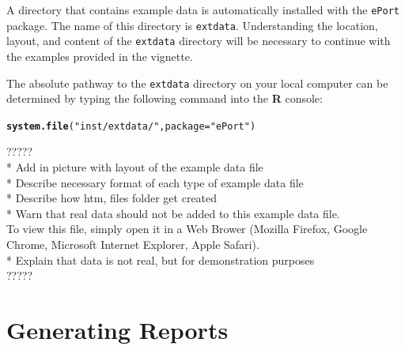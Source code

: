 \documentclass{article}\usepackage[]{graphicx}\usepackage[]{color}
\makeatletter
\newcommand{\hlstr}[1]{\textcolor[rgb]{0.192,0.494,0.8}{#1}}%
\newcommand{\hlstd}[1]{\textcolor[rgb]{0.345,0.345,0.345}{#1}}%
\newcommand{\hlkwc}[1]{\textcolor[rgb]{0.333,0.667,0.333}{#1}}%
\newcommand{\hlkwd}[1]{\textcolor[rgb]{0.737,0.353,0.396}{\textbf{#1}}}%
\newenvironment{kframe}{%
 \def\at@end@of@kframe{}%
 \ifinner\ifhmode%
  \def\at@end@of@kframe{\end{minipage}}%
  \begin{minipage}{\columnwidth}%
 \fi\fi%
 \def\FrameCommand##1{\hskip\@totalleftmargin \hskip-\fboxsep
 \colorbox{shadecolor}{##1}\hskip-\fboxsep
     \hskip-\linewidth \hskip-\@totalleftmargin \hskip\columnwidth}%
 \MakeFramed {\advance\hsize-\width
   \@totalleftmargin\z@ \linewidth\hsize
   \@setminipage}}%
 {\par\unskip\endMakeFramed%
 \at@end@of@kframe}
\newenvironment{knitrout}{}{} %
\numberwithin{equation}{section} %
\makeatother
\begin{document}
A directory that contains example data is automatically installed with the \texttt{ePort} package. The name of this directory is \texttt{extdata}. Understanding the location, layout, and content of the \texttt{extdata} directory will be necessary to continue with the examples provided in the vignette.

The absolute pathway to the \texttt{extdata} directory on your local computer can be determined by typing the following command into the \textbf{\textsf{R}} console: \\

\begin{knitrout}
\color{fgcolor}\begin{kframe}
\begin{alltt}
\hlkwd{system.file}\hlstd{(}\hlstr{"inst/extdata/"}\hlstd{,} \hlkwc{package} \hlstd{=} \hlstr{"ePort"}\hlstd{)}
\end{alltt}
\end{kframe}
\end{knitrout}

?????\\
* Add in picture with layout of the example data file  \\
* Describe necessary format of each type of example data file \\ 
* Describe how htm, files folder get created \\
* Warn that real data should not be added to this example data file.\\
To view this file, simply open it in a Web Brower (Mozilla Firefox, Google Chrome, Microsoft Internet Explorer, Apple Safari). \\
* Explain that data is not real, but for demonstration purposes\\
?????\\

\section{Generating Reports}
\end{document}
